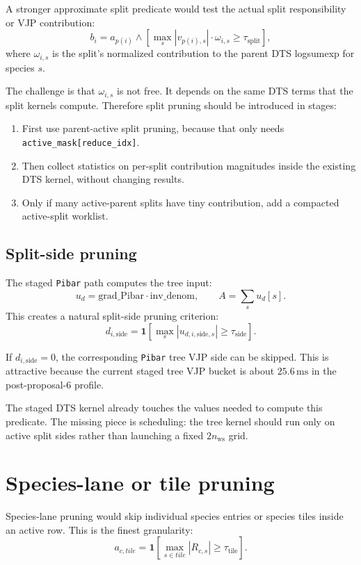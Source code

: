 \documentclass[11pt]{article}
\newcommand{\ms}{\,\mathrm{ms}}
\newcommand{\code}[1]{\texttt{#1}}
\begin{document}
A stronger approximate split predicate would test the actual split
responsibility or VJP contribution:
\[
  b_i =
  a_{p(i)}
  \wedge
  \left[
    \max_s |v_{p(i),s}| \cdot \omega_{i,s} \ge \tau_{\mathrm{split}}
  \right],
\]
where \(\omega_{i,s}\) is the split's normalized contribution to the parent DTS
logsumexp for species \(s\).

The challenge is that \(\omega_{i,s}\) is not free.  It depends on the same
DTS terms that the split kernels compute.  Therefore split pruning should be
introduced in stages:

\begin{enumerate}[leftmargin=*]
\item First use parent-active split pruning, because that only needs
      \code{active\_mask[reduce\_idx]}.
\item Then collect statistics on per-split contribution magnitudes inside the
      existing DTS kernel, without changing results.
\item Only if many active-parent splits have tiny contribution, add a compacted
      active-split worklist.
\end{enumerate}

\subsection{Split-side pruning}

The staged \code{Pibar} path computes the tree input:
\[
  u_d = \mathrm{grad\_Pibar} \cdot \mathrm{inv\_denom},
  \qquad
  A = \sum_s u_d[s].
\]
This creates a natural split-side pruning criterion:
\[
  d_{i,\mathrm{side}} =
  \mathbf{1}\left[
    \max_s |u_{d,i,\mathrm{side},s}| \ge \tau_{\mathrm{side}}
  \right].
\]

If \(d_{i,\mathrm{side}} = 0\), the corresponding \code{Pibar} tree VJP side
can be skipped.  This is attractive because the current staged tree VJP bucket
is about $25.6\ms$ in the post-proposal-6 profile.

The staged DTS kernel already touches the values needed to compute this
predicate.  The missing piece is scheduling: the tree kernel should run only on
active split sides rather than launching a fixed \(2 n_{\mathrm{ws}}\) grid.

\section{Species-lane or tile pruning}

Species-lane pruning would skip individual species entries or species tiles
inside an active row.  This is the finest granularity:
\[
  a_{c,tile} =
  \mathbf{1}\left[
    \max_{s \in tile} |R_{c,s}| \ge \tau_{\mathrm{tile}}
  \right].
\]
\end{document}
